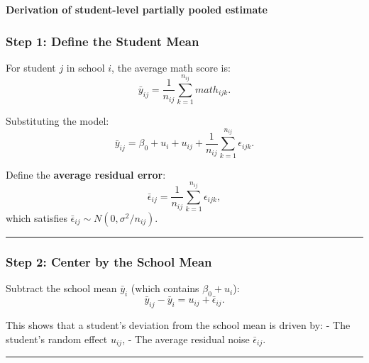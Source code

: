 \documentclass[
  letterpaper,
  DIV=11,
  numbers=noendperiod]{scrreprt}
\begin{document}
\begin{tcolorbox}[enhanced jigsaw, rightrule=.15mm, breakable, left=2mm, colframe=quarto-callout-tip-color-frame, opacityback=0, leftrule=.75mm, toprule=.15mm, colback=white, arc=.35mm, bottomrule=.15mm]

\textbf{Derivation of student-level partially pooled
estimate}\vspace{2mm}

\hypertarget{step-1-define-the-student-mean}{%
\subsubsection*{Step 1: Define the Student
Mean}\label{step-1-define-the-student-mean}}

For student \(j\) in school \(i\), the average math score is: \[
\bar{y}_{ij} = \frac{1}{n_{ij}} \sum_{k=1}^{n_{ij}} math_{ijk}.
\]

Substituting the model: \[
\bar{y}_{ij} = \beta_0 + u_i + u_{ij} + \frac{1}{n_{ij}} \sum_{k=1}^{n_{ij}} \epsilon_{ijk}.
\]

Define the \textbf{average residual error}: \[
\bar{\epsilon}_{ij} = \frac{1}{n_{ij}} \sum_{k=1}^{n_{ij}} \epsilon_{ijk},
\] which satisfies \(\bar{\epsilon}_{ij} \sim N(0, \sigma^2 / n_{ij})\).

\begin{center}\rule{0.5\linewidth}{0.5pt}\end{center}

\hypertarget{step-2-center-by-the-school-mean}{%
\subsubsection*{Step 2: Center by the School
Mean}\label{step-2-center-by-the-school-mean}}

Subtract the school mean \(\bar{y}_i\) (which contains
\(\beta_0 + u_i\)): \[
\bar{y}_{ij} - \bar{y}_i = u_{ij} + \bar{\epsilon}_{ij}.
\]

This shows that a student's deviation from the school mean is driven by:
- The student's random effect \(u_{ij}\), - The average residual noise
\(\bar{\epsilon}_{ij}\).

\begin{center}\rule{0.5\linewidth}{0.5pt}\end{center}

\hypertarget{step-3-target-quantity}{%
}
\end{tcolorbox}
\end{document}
